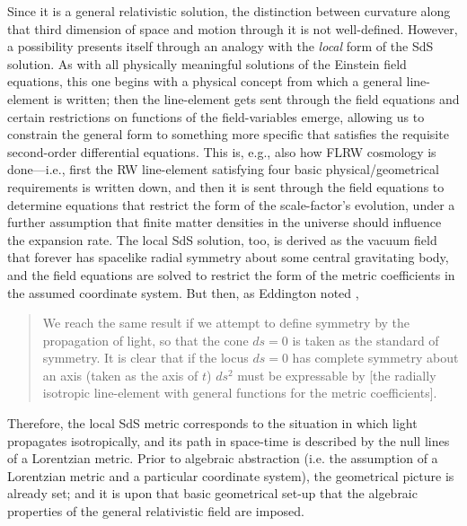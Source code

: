 \documentclass[11pt]{article}
\begin{document}
\begin{appendix}
Since it is a general relativistic solution, the distinction between curvature along that third dimension of space and motion through it is not well-defined. However, a possibility presents itself through an analogy with the \textit{local} form of the SdS solution. As with all physically meaningful solutions of the Einstein field equations, this one begins with a physical concept from which a general line-element is written; then the line-element gets sent through the field equations and certain restrictions on functions of the field-variables emerge, allowing us to constrain the general form to something more specific that satisfies the requisite second-order differential equations. This is, e.g., also how FLRW cosmology is done---i.e., first the RW line-element satisfying four basic physical/geometrical requirements is written down, and then it is sent through the field equations to determine equations that restrict the form of the scale-factor's evolution, under a further assumption that finite matter densities in the universe should influence the expansion rate. The local SdS solution, too, is derived as the vacuum field that forever has spacelike radial symmetry about some central gravitating body, and the field equations are solved to restrict the form of the metric coefficients in the assumed coordinate system. But then, as Eddington noted \cite{Eddington1923},
\begin{quote}
We reach the same result if we attempt to define symmetry by the propagation of light, so that the cone $ds=0$ is taken as the standard of symmetry. It is clear that if the locus $ds=0$ has complete symmetry about an axis (taken as the axis of $t$) $ds^2$ must be expressable by [the radially isotropic line-element with general functions for the metric coefficients].
\end{quote}
Therefore, the local SdS metric corresponds to the situation in which light propagates isotropically, and its path in space-time is described by the null lines of a Lorentzian metric. Prior to algebraic abstraction (i.e. the assumption of a Lorentzian metric and a particular coordinate system), the geometrical picture is already set; and it is upon that basic geometrical set-up that the algebraic properties of the general relativistic field are imposed. 


\end{appendix}
\end{document}
